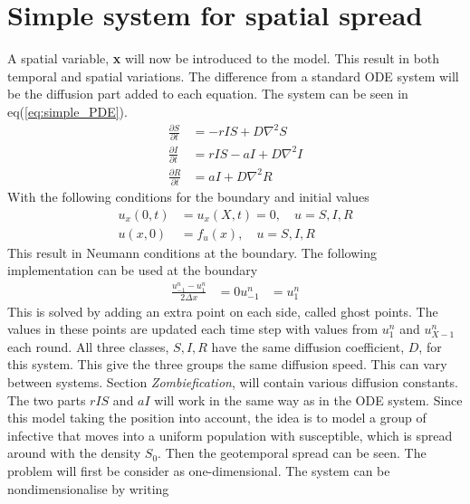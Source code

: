 \documentclass[%
twoside,                 %
final,                   %
10pt]{article}
\begin{document}
\section{Simple system for spatial spread}
A spatial variable, \textbf{x} will now be introduced to the model. This result in both temporal and spatial variations. The difference from a standard ODE system will be the diffusion part added to each equation. The system can be seen in eq(\ref{eq:simple_PDE}). 
\begin{equation} \label{eq:simple_PDE}
	\begin{aligned}
	\frac{\partial S}{\partial t} &= -rIS + D\nabla ^2 S\\
	\frac{\partial I}{\partial t} &= rIS- aI + D\nabla ^2 I\\
	\frac{\partial R}{\partial t} &= aI + D\nabla ^2 R
	\end{aligned}
\end{equation}
With the following conditions for the boundary and initial values
\begin{equation} \label{eq:boundary_initial}
	\begin{aligned}
	u_x(0,t) &= u_x(X,t) = 0,\quad u = S,I,R\\
	u(x,0) &= f_u(x),\quad u= S,I,R
	\end{aligned}
\end{equation}
This result in Neumann conditions at the boundary. The following implementation can be used at the boundary
\begin{equation}
	\begin{aligned}
	\frac{u_{-1}^n - u_1^n}{2\Delta x} &= 0
	u_{-1}^n &= u_1^n
	\end{aligned}
\end{equation}
This is solved by adding an extra point on each side, called ghost points. The values in these points are updated each time step with values from $u_1^n$ and $u_{X-1}^n$ each round. All three classes, $S,I,R$ have the same diffusion coefficient, $D$, for this system. This give the three groups the same diffusion speed. This can vary between systems. Section \emph{Zombiefication}, will contain various diffusion constants. The two parts $rIS$ and $aI$ will work in the same way as in the ODE system. Since this model taking the position into account, the idea is to model a group of infective that moves into a uniform population with susceptible, which is spread around with the density $S_0$. Then the geotemporal spread can be seen. The problem will first be consider as one-dimensional. The system can be nondimensionalise by writing 
\end{document}
